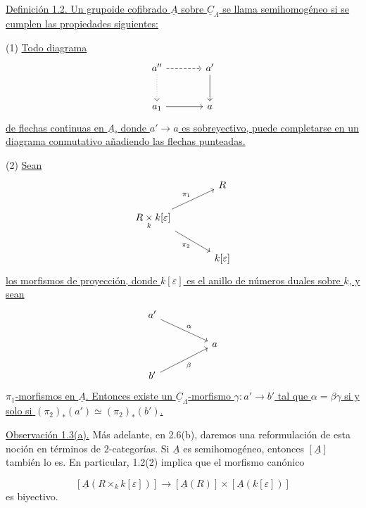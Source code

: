 \par\medskip\noindent
\underline{Definición 1.2. Un grupoide cofibrado $\underline A$ sobre
$\underline C_\Lambda$ se llama semihomogéneo si se cumplen las
propiedades siguientes:}

(1) \underline{Todo diagrama}
\[
\begin{tikzcd}[row sep=large,column sep=large]
a'' \arrow[r,dashed] \arrow[d,dotted] & a' \arrow[d] \\
a_1 \arrow[r] & a
\end{tikzcd}
\]
\underline{de flechas continuas en $\underline A$, donde
$a'\longrightarrow a$ es sobreyectivo, puede completarse en un diagrama
conmutativo añadiendo las flechas punteadas.}

(2) \underline{Sean}
\[
\begin{tikzcd}[column sep=large]
& R \\
R\underset{k}{\times}k[\varepsilon]
 \arrow[ur,"\pi_1"] \arrow[dr,"\pi_2"'] & \\
& k[\varepsilon]
\end{tikzcd}
\]
\underline{los morfismos de proyección, donde $k[\varepsilon]$ es el
anillo de números duales sobre $k$, y sean}
\[
\begin{tikzcd}[column sep=huge]
a' \arrow[dr,"\alpha"] & \\
& a \\
b' \arrow[ur,"\beta"'] &
\end{tikzcd}
\]
\underline{$\pi_1$-morfismos en $\underline A$. Entonces existe un
$\underline C_\Lambda$-morfismo $\gamma:a'\longrightarrow b'$ tal que
$\alpha=\beta\gamma$ si y solo si
$(\pi_2)_*(a')\simeq(\pi_2)_*(b')$.}

\underline{Observación 1.3(a).} Más adelante, en 2.6(b), daremos una
reformulación de esta noción en términos de $2$-categorías. Si
$\underline A$ es semihomogéneo, entonces $[\underline A]$ también lo
es. En particular, 1.2(2) implica que el morfismo canónico


\[
 [\underline A(R\times_k k[\varepsilon])]
 \longrightarrow
 [\underline A(R)]\times[\underline A(k[\varepsilon])]
\]
es biyectivo.

